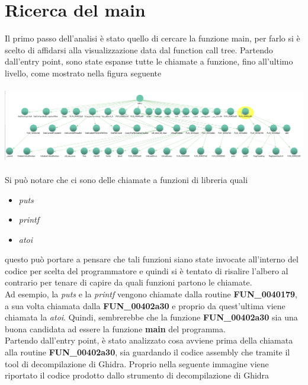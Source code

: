 \documentclass[12pt]{extarticle}
\begin{document}
\section{Ricerca del main}
Il primo passo dell'analisi è stato quello di cercare la funzione main, per farlo si è scelto di affidarsi alla visualizzazione data dal function call tree. Partendo dall'entry point, sono state espanse tutte le chiamate a funzione, fino all'ultimo livello, come mostrato nella figura seguente\\\\
\includegraphics[scale=0.3]{immagini/hw1_main}\\\\
Si può notare che ci sono delle chiamate a funzioni di libreria quali
\begin{itemize}
\item \textit{puts}
\item \textit{printf}
\item \textit{atoi}
\end{itemize}
questo può portare a pensare che tali funzioni siano state invocate all'interno del codice per scelta del programmatore e quindi si è tentato di risalire l'albero al contrario per tenare di capire da quali funzioni partono le chiamate.\\
Ad esempio, la \textit{puts} e la \textit{printf} vengono chiamate dalla routine \textbf{FUN\_0040179}, a sua volta chiamata dalla \textbf{FUN\_00402a30} e proprio da quest'ultima viene chiamata la \textit{atoi}. Quindi, sembrerebbe che la funzione \textbf{FUN\_00402a30} sia una buona candidata ad essere la funzione \textbf{main} del programma.\\ 
Partendo dall'entry point, è stato analizzato cosa avviene prima della chiamata alla routine \textbf{FUN\_00402a30}, sia guardando il codice assembly che tramite il tool di decompilazione di Ghidra. Proprio nella seguente immagine viene riportato il codice prodotto dallo strumento di decompilazione di Ghidra\\\\
\end{document}
